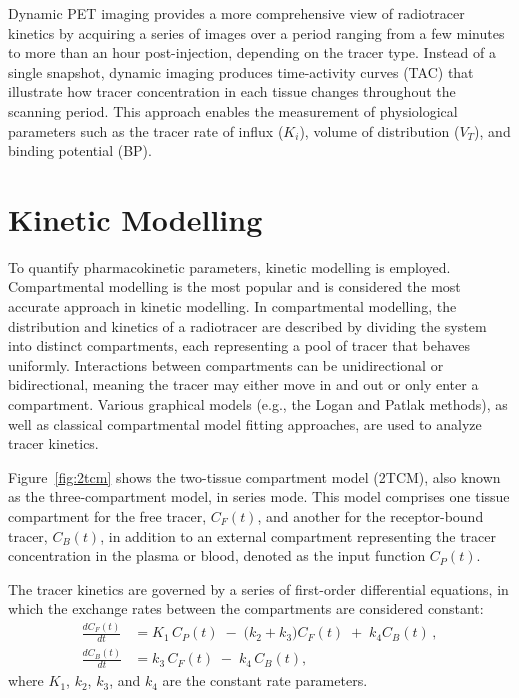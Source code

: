 Dynamic PET imaging provides a more comprehensive view of radiotracer kinetics by acquiring a series of images over a period ranging from a few minutes to more than an hour post-injection, depending on the tracer type.
Instead of a single snapshot, dynamic imaging produces time-activity curves (TAC) that illustrate how tracer concentration in each tissue changes throughout the scanning period.
This approach enables the measurement of physiological parameters such as the tracer rate of influx (\(K_i\)), volume of distribution (\(V_T\)), and binding potential (BP).

\section{Kinetic Modelling}
To quantify pharmacokinetic parameters, kinetic modelling is employed.
Compartmental modelling is the most popular and is considered the most accurate approach in kinetic modelling.
In compartmental modelling, the distribution and kinetics of a radiotracer are described by dividing the system into distinct compartments, each representing a pool of tracer that behaves uniformly.
Interactions between compartments can be unidirectional or bidirectional, meaning the tracer may either move in and out or only enter a compartment.
Various graphical models (e.g., the Logan \cite{logan1990graphical} and Patlak \cite{patlak1983graphical} methods), as well as classical compartmental model fitting approaches, are used to analyze tracer kinetics.

Figure~\ref{fig:2tcm} shows the two-tissue compartment model (2TCM), also known as the three-compartment model, in series mode.
This model comprises one tissue compartment for the free tracer, \(C_F(t)\), and another for the receptor-bound tracer, \(C_B(t)\), in addition to an external compartment representing the tracer concentration in the plasma or blood, denoted as the input function \(C_P(t)\).

The tracer kinetics are governed by a series of first-order differential equations, in which the exchange rates between the compartments are considered constant:
\begin{align}
	\frac{dC_F(t)}{dt} & = K_1 \, C_P(t) \;-\; \bigl(k_2 + k_3\bigr) C_F(t) \;+\; k_4 C_B(t) \,, \\[6pt]
	\frac{dC_B(t)}{dt} & = k_3 \, C_F(t) \;-\; k_4 \, C_B(t),
\end{align}
where \(K_1\), \(k_2\), \(k_3\), and \(k_4\) are the constant rate parameters.



